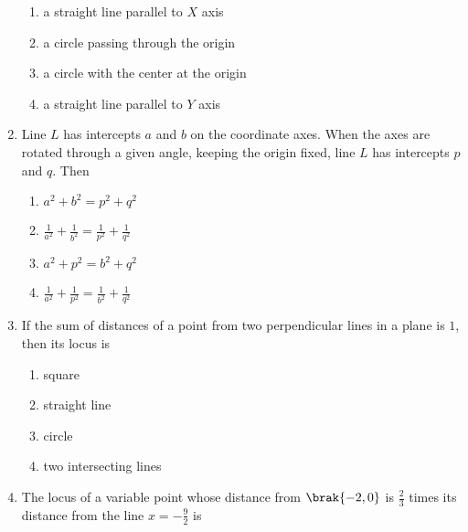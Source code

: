 \begin{enumerate}[label=\thesubsection.\arabic*.,ref=\thesubsection.\theenumi]
\begin{multicols}{2}
\begin{enumerate}
    \item a straight line parallel to $X$ axis
    \item a circle passing through the origin
    \item a circle with the center at the origin 
    \item a straight line parallel to $Y$ axis 
\end{enumerate}
\end{multicols}
\item Line $L$ has intercepts $a$ and $b$ on the coordinate axes. When the axes are rotated through a given angle, keeping the origin fixed, line $L$ has intercepts $p$ and $q$. Then

\hfill {}
\begin{multicols}{2}
\begin{enumerate}
    \item $a^2+b^2=p^2+q^2$
    \item $\frac{1}{a^2}+\frac{1}{b^2}=\frac{1}{p^2}+\frac{1}{q^2}$
    \item $a^2+p^2=b^2+q^2$
    \item $\frac{1}{a^2}+\frac{1}{p^2}=\frac{1}{b^2}+\frac{1}{q^2}$
\end{enumerate}
\end{multicols}
\item If the sum of distances of a point from two perpendicular lines in a plane is $1$, then its locus is
\hfill {}
\begin{multicols}{2}
\begin{enumerate}
        \item square
        \item straight line
        \item circle
        \item two intersecting lines
\end{enumerate}
\end{multicols}
\item The locus of a variable point whose distance from $\brak{-2,0}$ is $\frac{2}{3}$ times its distance from the line $x=-\frac{9}{2}$ is
\hfill {}
\begin{multicols}{2}
\begin{enumerate}
    

\end{enumerate}
\end{multicols}
\end{enumerate}
